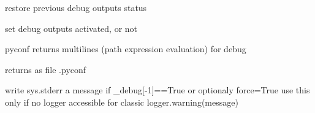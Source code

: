 \documentclass[a4paper,10pt,english]{sphinxmanual}
\begin{document}

\begin{fulllineitems}
\label{\detokenize{commands/apidoc/src:src.debug.pop_debug}}
restore previous debug outputs status

\end{fulllineitems}


\begin{fulllineitems}
\label{\detokenize{commands/apidoc/src:src.debug.push_debug}}
set debug outputs activated, or not

\end{fulllineitems}


\begin{fulllineitems}
\label{\detokenize{commands/apidoc/src:src.debug.saveConfigDbg}}
pyconf returns multilines (path expression evaluation) for debug

\end{fulllineitems}


\begin{fulllineitems}
\label{\detokenize{commands/apidoc/src:src.debug.saveConfigStd}}
returns as file .pyconf

\end{fulllineitems}


\begin{fulllineitems}
\label{\detokenize{commands/apidoc/src:src.debug.tofix}}
write sys.stderr a message if \_debug{[}-1{]}==True or optionaly force=True
use this only if no logger accessible for classic logger.warning(message)

\end{fulllineitems}
\end{document}
